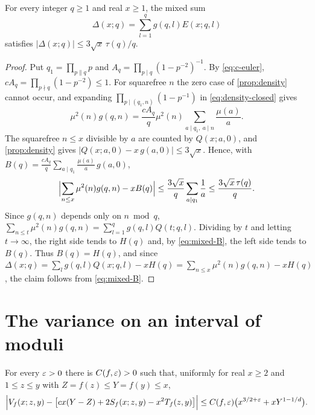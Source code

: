 \begin{lemma}\label{lem:mixed}
For every integer $q\ge1$ and real $x\ge1$, the mixed sum
\[
\Delta(x;q)=\sum_{l=1}^qg(q,l)E(x;q,l)
\]
satisfies $|\Delta(x;q)|\le3\sqrt x\,\tau(q)/q$.
\end{lemma}

\begin{proof}
Put $q_1=\prod_{p\parallel q}p$ and $A_q=\prod_{p\mid q}(1-p^{-2})^{-1}$. By \eqref{eq:c-euler}, $cA_q=\prod_{p\nmid q}(1-p^{-2})\le1$. For squarefree $n$ the zero case of \cref{prop:density} cannot occur, and expanding $\prod_{p\mid(q_1,n)}(1-p^{-1})$ in \eqref{eq:density-closed} gives
\[
\mu^2(n)g(q,n)=\frac{cA_q}q\mu^2(n)\sum_{a\mid q_1,\ a\mid n}\frac{\mu(a)}a.
\]
The squarefree $n\le x$ divisible by $a$ are counted by $Q(x;a,0)$, and \cref{prop:density} gives $|Q(x;a,0)-x\,g(a,0)|\le3\sqrt x$. Hence, with $B(q)=\frac{cA_q}q\sum_{a\mid q_1}\frac{\mu(a)}a\,g(a,0)$,
\begin{equation}\label{eq:mixed-B}
\Bigl|\sum_{n\le x}\mu^2(n)g(q,n)-xB(q)\Bigr|\le\frac{3\sqrt x}q\sum_{a\mid q_1}\frac1a\le\frac{3\sqrt x\,\tau(q)}q.
\end{equation}
Since $g(q,n)$ depends only on $n\bmod q$,
$\sum_{n\le t}\mu^2(n)g(q,n)=\sum_{l=1}^qg(q,l)Q(t;q,l)$. Dividing by $t$ and letting $t\to\infty$, the right side tends to $H(q)$ and, by \eqref{eq:mixed-B}, the left side tends to $B(q)$. Thus $B(q)=H(q)$, and since $\Delta(x;q)=\sum_{l}g(q,l)Q(x;q,l)-xH(q)=\sum_{n\le x}\mu^2(n)g(q,n)-xH(q)$, the claim follows from \eqref{eq:mixed-B}.
\end{proof}

\section{The variance on an interval of moduli}

\begin{proposition}\label{prop:reduction}
For every $\varepsilon>0$ there is $C(f,\varepsilon)>0$ such that, uniformly for real $x\ge2$ and $1\le z\le y$ with $Z=f(z)\le Y=f(y)\le x$,
\[
\Bigl|V_f(x;z,y)-\bigl[cx(Y-Z)+2S_f(x;z,y)-x^2T_f(z,y)\bigr]\Bigr|\le C(f,\varepsilon)\bigl(x^{3/2+\varepsilon}+xY^{1-1/d}\bigr).
\]
\end{proposition}

